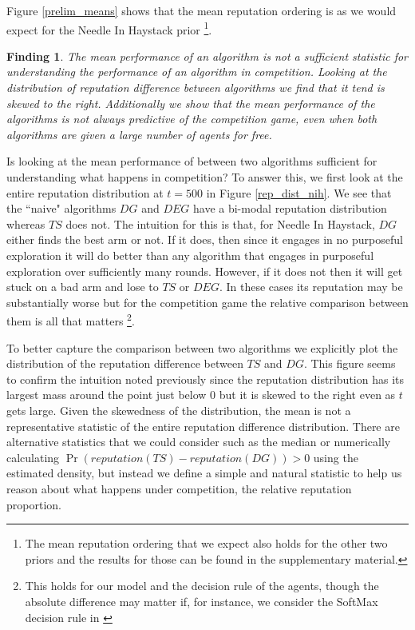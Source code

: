\documentclass{article}
\theoremstyle{definition}
\newtheorem{finding}{Finding}
\begin{document}
Figure \ref{prelim_means} shows that the mean reputation ordering is as we would expect for the Needle In Haystack prior \footnote{The mean reputation ordering that we expect also holds for the other two priors and the results for those can be found in the supplementary material.}.

\begin{finding}
\textit{The mean performance of an algorithm is not a sufficient statistic for understanding the performance of an algorithm in competition. Looking at the distribution of reputation difference between algorithms we find that it tend is skewed to the right. Additionally we show that the mean performance of the algorithms is not always predictive of the competition game, even when both algorithms are given a large number of agents for free.}
\end{finding}

Is looking at the mean performance of between two algorithms sufficient for understanding what happens in competition? To answer this, we first look at the entire reputation distribution at $t = 500$ in Figure \ref{rep_dist_nih}. We see that the ``naive" algorithms $DG$ and $DEG$ have a bi-modal reputation distribution whereas $TS$ does not. The intuition for this is that, for Needle In Haystack, $DG$ either finds the best arm or not. If it does, then since it engages in no purposeful exploration it will do better than any algorithm that engages in purposeful exploration over sufficiently many rounds. However, if it does not then it will get stuck on a bad arm and lose to $TS$ or $DEG$. In these cases its reputation may be substantially worse but for the competition game the relative comparison between them is all that matters \footnote{This holds for our model and the decision rule of the agents, though the absolute difference may matter if, for instance, we consider the SoftMax decision rule in \citet{mansour2018competing}}.

To better capture the comparison between two algorithms we explicitly plot the distribution of the reputation difference between $TS$ and $DG$. This figure seems to confirm the intuition noted previously since the reputation distribution has its largest mass around the point just below 0 but it is skewed to the right even as $t$ gets large. Given the skewedness of the distribution, the mean is not a representative statistic of the entire reputation difference distribution. There are alternative statistics that we could consider such as the median or numerically calculating $\Pr(reputation(TS) - reputation(DG)) > 0$ using the estimated density, but instead we define a simple and natural statistic to help us reason about what happens under competition, the relative reputation proportion.
\end{document}
